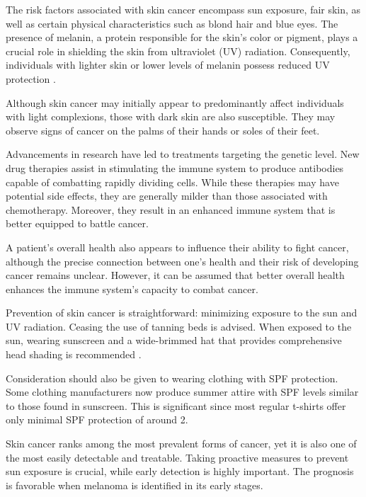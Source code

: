 The risk factors associated with skin cancer encompass sun exposure, fair skin,
as well as certain physical characteristics such as blond hair and blue eyes.
The presence of melanin, a protein responsible for the skin's color or pigment,
plays a crucial role in shielding the skin from ultraviolet (UV) radiation.
Consequently, individuals with lighter skin or lower levels of melanin possess
reduced UV protection \cite{OrigenAndTreatment}. \newline

Although skin cancer may initially appear to predominantly affect individuals
with light complexions, those with dark skin are also susceptible. They may
observe signs of cancer on the palms of their hands or soles of their feet.
\newline

Advancements in research have led to treatments targeting the genetic level.
New drug therapies assist in stimulating the immune system to produce
antibodies capable of combatting rapidly dividing cells. While these therapies
may have potential side effects, they are generally milder than those
associated with chemotherapy. Moreover, they result in an enhanced immune
system that is better equipped to battle cancer. \newline

A patient's overall health also appears to influence their ability to fight
cancer, although the precise connection between one's health and their risk of
developing cancer remains unclear. However, it can be assumed that better
overall health enhances the immune system's capacity to combat cancer. \newline

Prevention of skin cancer is straightforward: minimizing exposure to the sun
and UV radiation. Ceasing the use of tanning beds is advised. When exposed to
the sun, wearing sunscreen and a wide-brimmed hat that provides comprehensive
head shading is recommended \cite{OrigenAndTreatment}. \newline

Consideration should also be given to wearing clothing with SPF protection.
Some clothing manufacturers now produce summer attire with SPF levels similar
to those found in sunscreen. This is significant since most regular t-shirts
offer only minimal SPF protection of around 2. \newline

Skin cancer ranks among the most prevalent forms of cancer, yet it is also one
of the most easily detectable and treatable. Taking proactive measures to
prevent sun exposure is crucial, while early detection is highly important. The
prognosis is favorable when melanoma is identified in its early stages.
